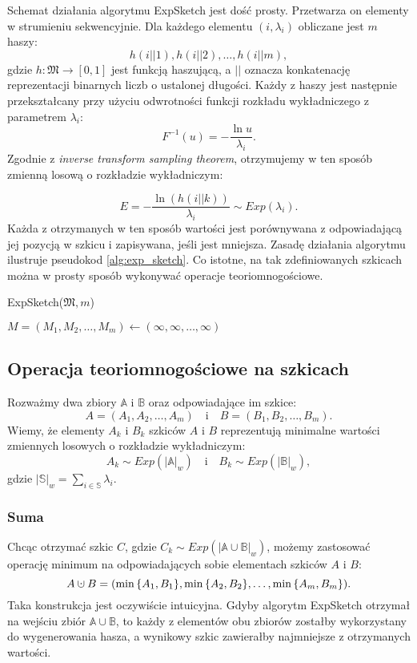     Schemat działania algorytmu ExpSketch jest dość prosty. Przetwarza on elementy w strumieniu sekwencyjnie. Dla każdego elementu $(i, \lambda_{i})$ obliczane jest $m$ haszy:
    \[
        h(i || 1), h(i || 2), \dots, h(i || m),
    \]
    gdzie $h: \mathfrak{M} \rightarrow [0,1]$ jest funkcją haszującą, a $||$ oznacza konkatenację reprezentacji binarnych liczb o ustalonej długości. Każdy z haszy jest następnie przekształcany przy użyciu odwrotności funkcji rozkładu wykładniczego z parametrem $\lambda_i$:
    \[
        F^{-1}(u) = - \frac{\ln u}{\lambda_i}.
    \]
    Zgodnie z \textit{inverse transform sampling theorem}\cite{Devroye_1986a}, otrzymujemy w ten sposób zmienną losową o rozkładzie wykładniczym:

    \[
        E = - \frac{\ln(h(i || k))}{\lambda_i} \sim Exp(\lambda_i).
    \]
    Każda z otrzymanych w ten sposób wartości jest porównywana z odpowiadającą jej pozycją w szkicu i zapisywana, jeśli jest mniejsza. Zasadę działania algorytmu ilustruje pseudokod \ref{alg:exp_sketch}. Co istotne, na tak zdefiniowanych szkicach można w prosty sposób wykonywać operacje teoriomnogościowe. 

    \begin{algorithm}
        \caption{ExpSketch($\mathfrak{M}, m$)}\label{alg:exp_sketch}
        $M = (M_1, M_2, \dots, M_m) \gets (\infty, \infty, \dots, \infty)$\;
    \end{algorithm}

\subsection{Operacja teoriomnogościowe na szkicach}
    Rozważmy dwa zbiory $\mathbb{A}$ i $\mathbb{B}$ oraz odpowiadające im szkice: 
    \[
        A = (A_1, A_2, \dots, A_m) \quad \text{i} \quad B = (B_1, B_2, \dots, B_m).  
    \]
    Wiemy, że elementy $A_k$ i $B_k$ szkiców $A$ i $B$ reprezentują minimalne wartości zmiennych losowych o rozkładzie wykładniczym:
    \[
        A_k \sim Exp(|\mathbb{A}|_{w}) \quad \text{i} \quad B_k \sim Exp(|\mathbb{B}|_{w}), 
    \]
    gdzie $|\mathbb{S}|_{w} = \sum\limits_{i \in \mathbb{S}}\lambda_i$. 
    \subsubsection*{Suma}
    Chcąc otrzymać szkic $C$, gdzie $C_k \sim Exp(|\mathbb{A} \cup \mathbb{B}|_{w})$, możemy zastosować operację minimum na odpowiadających sobie elementach szkiców $A$ i $B$:    
    \[
        A \mathbin{\mathaccent\cdot\cup} B = (\min{\{A_1, B_1\}}, \min{\{A_2, B_2\}}, \dots, \min{\{A_m, B_m\}}).
    \]
    Taka konstrukcja jest oczywiście intuicyjna. Gdyby algorytm ExpSketch otrzymał na wejściu zbiór $\mathbb{A} \cup \mathbb{B}$, to każdy z elementów obu zbiorów zostałby wykorzystany do wygenerowania hasza, a wynikowy szkic zawierałby najmniejsze z otrzymanych wartości.
    
